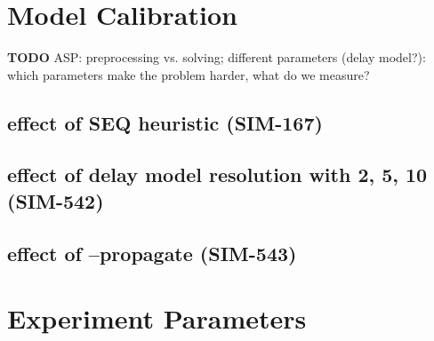 \documentclass{article}
\begin{document}
\appendix



\section{Model Calibration}\label{subsec:model_calibration}

\begin{mdframed}
{\bf TODO} ASP: preprocessing vs. solving; different parameters (delay model?): which parameters make the problem harder, what do we measure?
\end{mdframed}

\subsection{effect of SEQ heuristic (SIM-167)}

\subsection{effect of delay model resolution with 2, 5, 10 (SIM-542)}

\subsection{effect of --propagate (SIM-543)}






\section{Experiment Parameters}\label{subsec:experiment_parameters}
\end{document}
